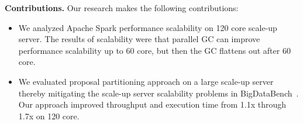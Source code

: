 
\textbf{Contributions.} Our research makes the following contributions:
\begin{itemize}
\item 
We analyzed Apache Spark performance scalability on 120 core scale-up server.
The results of scalability were that parallel GC can improve performance
scalability up to 60 core, but then the GC flattens out after 60 core.
\item 
We evaluated proposal partitioning approach on a large scale-up server
thereby mitigating the scale-up server scalability problems in BigDataBench~\cite{wang2014bigdatabench}.
Our approach improved throughput and execution time from 1.1x through
1.7x on 120 core.
\end{itemize}


